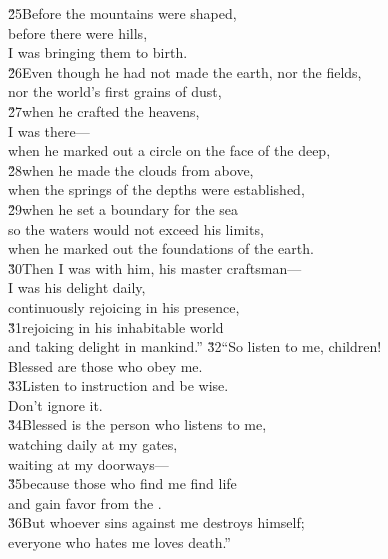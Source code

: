 \begin{poetry}
\poeml \v{25}Before the mountains were shaped, \\
\poemll    before there were hills, \\
\poemlll       I was bringing them to birth. \\
\poeml \v{26}Even though he had not made the earth, nor the fields, \\
\poemll    nor the world's first grains of dust, \\
\poeml \v{27}when he crafted the heavens, \\
\poemll    I was there--- \\
\poemlll       when he marked out a circle on the face of the deep, \\
\poeml \v{28}when he made the clouds from above, \\
\poemll    when the springs of the depths were established, \\
\poeml \v{29}when he set a boundary for the sea \\
\poemll    so the waters would not exceed his limits, \\
\poemlll       when he marked out the foundations of the earth. \\
\poeml \v{30}Then I was with him, his master craftsman--- \\
\poemll    I was his delight daily, \\
\poemlll       continuously rejoicing in his presence, \\
\poeml \v{31}rejoicing in his inhabitable world \\
\poemll    and taking delight in mankind.''
\poeml \v{32}``So listen to me, children! \\
\poemll    Blessed are those who obey me. \\
\poeml \v{33}Listen to instruction and be wise. \\
\poemll    Don't ignore it. \\
\poeml \v{34}Blessed is the person who listens to me, \\
\poemll    watching daily at my gates, \\
\poemlll       waiting at my doorways--- \\
\poeml \v{35}because those who find me find life \\
\poemll    and gain favor from the . \\
\poeml \v{36}But whoever sins against me destroys himself; \\
\poemll    everyone who hates me loves death.''
\end{poetry}

